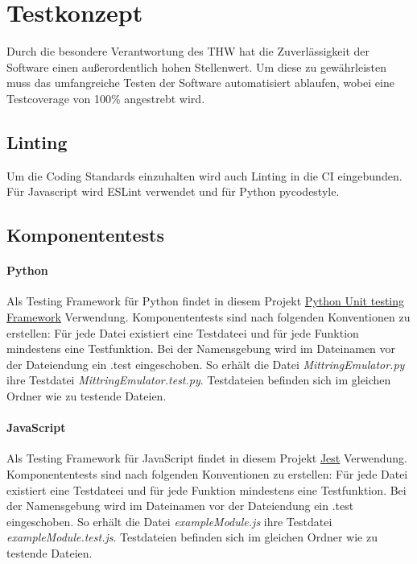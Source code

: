 \section{Testkonzept}
Durch die besondere Verantwortung des THW hat die Zuverlässigkeit der Software einen außerordentlich hohen Stellenwert. Um diese zu gewährleisten muss das umfangreiche Testen der Software automatisiert ablaufen, wobei eine Testcoverage von 100\% angestrebt wird.
\subsection{Linting}
Um die Coding Standards einzuhalten wird auch Linting in die CI eingebunden. Für Javascript wird
ESLint verwendet und für Python pycodestyle.
\subsection{Komponententests}
\paragraph{Python}
Als Testing Framework für Python findet in diesem Projekt \href{https://docs.python.org/3/library/unittest.html}{Python Unit testing Framework} Verwendung. Komponententests sind nach folgenden Konventionen zu erstellen: Für jede Datei existiert eine Testdateei und für jede Funktion mindestens eine Testfunktion. Bei der Namensgebung wird im Dateinamen vor der Dateiendung ein .test eingeschoben. So erhält die Datei \textit{MittringEmulator.py} ihre Testdatei \textit{MittringEmulator.test.py}. Testdateien befinden sich im gleichen Ordner wie zu testende Dateien.
\paragraph{JavaScript}
Als Testing Framework für JavaScript findet in diesem Projekt \href{https://facebook.github.io/jest/docs/en/getting-started.htmll}{Jest} Verwendung. Komponententests sind nach folgenden Konventionen zu erstellen: Für jede Datei existiert eine Testdateei und für jede Funktion mindestens eine Testfunktion. Bei der Namensgebung wird im Dateinamen vor der Dateiendung ein .test eingeschoben. So erhält die Datei \textit{exampleModule.js} ihre Testdatei \textit{exampleModule.test.js}. Testdateien befinden sich im gleichen Ordner wie zu testende Dateien.
